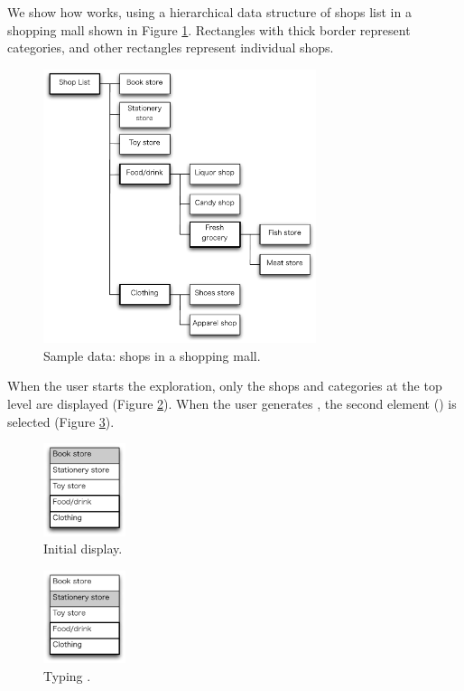 \documentclass{article}
\begin{document}
We show how {\ST} works, using a hierarchical data structure of
shops list in a shopping mall shown in Figure \ref{fig1}.
Rectangles with thick border represent categories, and
other rectangles represent individual shops.

\begin{figure}[H]
\centerline{\includegraphics[width=80mm,bb=0 0 490 490]{figures/fig1.pdf}}
\caption{Sample data: shops in a shopping mall.}
\label{fig1}
\end{figure}

When the user starts the exploration, only the shops and categories
at the top level are displayed (Figure \ref{fig2}).
When the user generates {\D},
the second element () is selected (Figure \ref{fig3}).

\begin{figure}[H]
\centerline{\includegraphics[width=24mm,bb=0 0 139 157]{figures/fig2.pdf}}
\caption{Initial display.}
\label{fig2}
\end{figure}

\begin{figure}[H]
\centerline{\includegraphics[width=24mm,bb=0 0 139 157]{figures/fig3.pdf}}
\caption{Typing {\D}.}
\label{fig3}
\end{figure}
\end{document}
